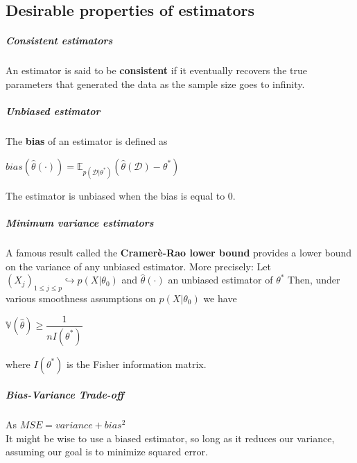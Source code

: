 \subsection{Desirable properties of estimators}
\subparagraph{Consistent estimators}
An estimator is said to be \textbf{consistent} if it eventually recovers the true
parameters that generated the data as the sample size goes to infinity. 

\subparagraph{Unbiased estimator}
The \textbf{bias} of an estimator is defined as 
\begin{center}
    $bias\left(\hat{\theta}(\cdot)\right) = \mathbb{E}_{p(\mathcal{D}|\theta^{*})}
    \left(\hat{\theta}(\mathcal{D})-\theta^{*}\right)$
\end{center}
The estimator is unbiased when the bias is equal to 0.

\subparagraph{Minimum variance estimators}
A famous result called the \textbf{Cramerè-Rao lower bound} provides a lower bound on the
variance of any unbiased estimator. More precisely:
Let $\left(X_{j}\right)_{1 \leq j \leq p} \hookrightarrow p(X|\theta_{0})$ and 
$\hat{\theta}(\cdot)$ an unbiased estimator of $\theta^{*}$
Then, under various smoothness assumptions on $p(X|\theta_{0})$ we have  
\begin{center}
    $\mathbb{V}(\hat{\theta}) \geq \dfrac{1}{nI(\theta^{*})}$
\end{center}
where $I(\theta^{*})$ is the Fisher information matrix.

\subparagraph{Bias-Variance Trade-off} 
As $MSE = variance + bias^{2}$\\
It might be wise to use a biased estimator, so long as it reduces our variance, assuming
our goal is to minimize squared error. 


